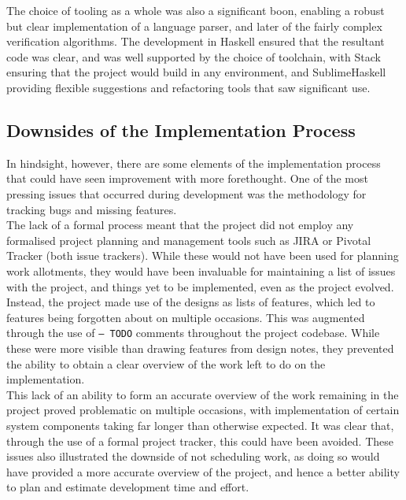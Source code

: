 The choice of tooling as a whole was also a significant boon, enabling a robust but clear implementation of a language parser, and later of the fairly complex verification algorithms.
The development in Haskell ensured that the resultant code was clear, and was well supported by the choice of toolchain, with Stack ensuring that the project would build in any environment, and SublimeHaskell providing flexible suggestions and refactoring tools that saw significant use. 


\subsection{Downsides of the Implementation Process} %
\label{sub:downsides_of_the_implementation_process}
In hindsight, however, there are some elements of the implementation process that could have seen improvement with more forethought. 
One of the most pressing issues that occurred during development was the methodology for tracking bugs and missing features. \\

The lack of a formal process meant that the project did not employ any formalised project planning and management tools such as JIRA or Pivotal Tracker (both issue trackers).
While these would not have been used for planning work allotments, they would have been invaluable for maintaining a list of issues with the project, and things yet to be implemented, even as the project evolved.
Instead, the project made use of the designs as lists of features, which led to features being forgotten about on multiple occasions.
This was augmented through the use of \texttt{-- TODO} comments throughout the project codebase.
While these were more visible than drawing features from design notes, they prevented the ability to obtain a clear overview of the work left to do on the implementation.\\

This lack of an ability to form an accurate overview of the work remaining in the project proved problematic on multiple occasions, with implementation of certain system components taking far longer than otherwise expected.
It was clear that, through the use of a formal project tracker, this could have been avoided.
These issues also illustrated the downside of not scheduling work, as doing so would have provided a more accurate overview of the project, and hence a better ability to plan and estimate development time and effort. 

